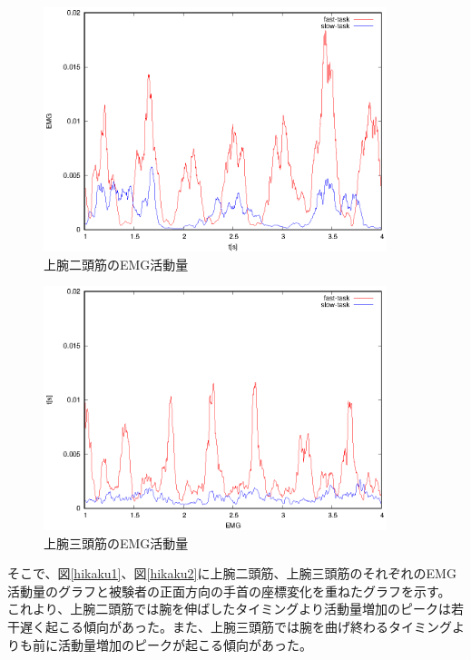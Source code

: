\documentclass{jsarticle}
\begin{document}
\begin{figure}[htb]
\begin{center}
\includegraphics[width=10cm]{kkdata1.eps}
\caption{上腕二頭筋のEMG活動量}
\label{kkdata1}
\end{center}
\end{figure}


\begin{figure}[htb]
\begin{center}
\includegraphics[width=10cm]{kkdata2.eps}
\caption{上腕三頭筋のEMG活動量}
\label{kkdata2}
\end{center}
\end{figure}


\newpage
そこで、図\ref{hikaku1}、図\ref{hikaku2}に上腕二頭筋、上腕三頭筋のそれぞれのEMG活動量のグラフと被験者の正面方向の手首の座標変化を重ねたグラフを示す。
これより、上腕二頭筋では腕を伸ばしたタイミングより活動量増加のピークは若干遅く起こる傾向があった。また、上腕三頭筋では腕を曲げ終わるタイミングよりも前に活動量増加のピークが起こる傾向があった。
\end{document}
